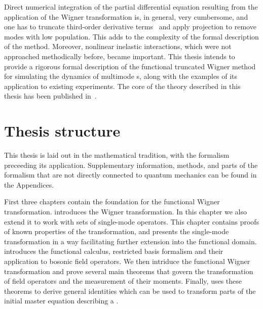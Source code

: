 Direct numerical integration of the partial differential equation resulting from the application of the Wigner transformation is, in general, very cumbersome, and one has to truncate third-order derivative terms~\cite{Drummond1993,Steel1998,Sinatra2002} and apply projection to remove modes with low population.
This adds to the complexity of the formal description of the method.
Moreover, nonlinear inelastic interactions, which were not approached methodically before, became important.
This thesis intends to provide a rigorous formal description of the functional truncated Wigner method for simulating the dynamics of multimode s, along with the examples of its application to existing experiments.
The core of the theory described in this thesis has been published in~\cite{Opanchuk2013}.


\section{Thesis structure}

This thesis is laid out in the mathematical tradition, with the formalism preceeding its application.
Supplementary information, methods, and parts of the formalism that are not directly connected to quantum mechanics can be found in the Appendices.

First three chapters contain the foundation for the functional Wigner transformation.
 introduces the Wigner transformation.
In this chapter we also extend it to work with sets of single-mode operators.
This chapter contains proofs of known properties of the transformation, and presents the single-mode transformation in a way facilitating further extension into the functional domain.
 introduces the functional calculus, restricted basis formalism and their application to bosonic field operators.
We then intriduce the functional Wigner transformation and prove several main theorems that govern the transformation of field operators and the measurement of their moments.
Finally,  uses these theorems to derive general identities which can be used to transform parts of the initial master equation describing a .

